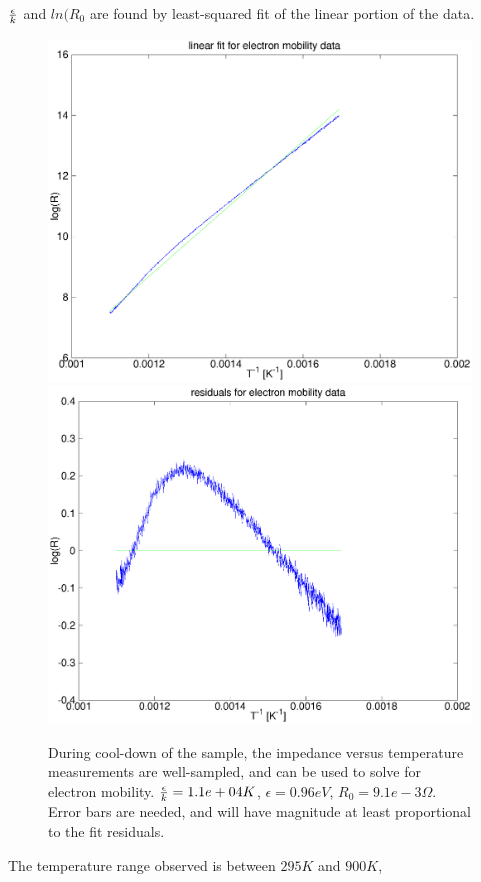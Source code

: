 \documentclass[12pt,oneside,english]{article}
\begin{document}
	${\epsilon\over{k}}$ and $ln(R_0$ are found by least-squared fit of the linear portion of the data.
	
	\begin{figure}
	
	\includegraphics[scale=0.4]{images/electron_mobility.eps} 
	\includegraphics[scale=0.4]{images/electron_mobility_residual.eps}
	\label{f:emobility}
	\caption{During cool-down of the sample, the impedance versus temperature measurements are well-sampled, and can be used to solve for electron mobility.  ${\epsilon\over{k}} = 1.1e+04 K$, $\epsilon = 0.96 eV$, $R_0 = 9.1e-3\Omega$.  Error bars are needed, and will have magnitude at least proportional to the fit residuals.}
	\end{figure}
	The temperature range observed is between $295K$ and $900K$, 
	
\end{document}
